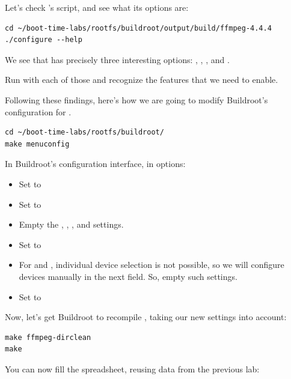 Let's check 's  script, and see what its
options are:

\begin{verbatim}
cd ~/boot-time-labs/rootfs/buildroot/output/build/ffmpeg-4.4.4
./configure --help
\end{verbatim}

We see that  has precisely three interesting options:
, , ,
 and .

Run  with each of those and recognize the features that
we need to enable.

Following these findings, here's how we are going to modify Buildroot's
configuration for .

\begin{verbatim}
cd ~/boot-time-labs/rootfs/buildroot/
make menuconfig
\end{verbatim}

In Buildroot's configuration interface, in  options:

\begin{itemize}
\item Set  to 
\item Set  to 
\item Empty the , ,
      ,  and  settings.
\item Set  to 
\item For  and ,
      individual device selection is not possible, so we will configure
      devices manually in the next field. So, empty such settings.
\item Set  to\\
\end{itemize}

Now, let's get Buildroot to recompile , taking our new
settings into account:

\begin{verbatim}
make ffmpeg-dirclean
make
\end{verbatim}

You can now fill the  spreadsheet,
reusing data from the previous lab:

